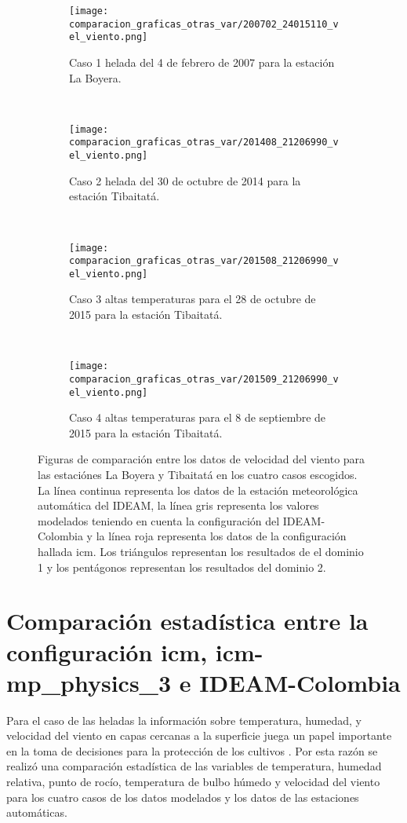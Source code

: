 \begin{figure}[H]
    
\begin{subfigure}[normla]{0.4\textwidth}
\caption{Caso 1 helada del 4 de febrero de 2007 para la estación La Boyera.}
\label{caso1_tiba_wrf_vv}
\texttt{[image: comparacion\_graficas\_otras\_var/200702\_24015110\_vel\_viento.png]}
\end{subfigure}
~
\begin{subfigure}[normla]{0.4\textwidth}
\caption{Caso 2 helada del 30 de octubre de 2014 para la estación Tibaitatá.}
\label{caso2_tiba_wrf_vv}
\texttt{[image: comparacion\_graficas\_otras\_var/201408\_21206990\_vel\_viento.png]}
\end{subfigure}
~
\centering
\begin{subfigure}[normla]{0.4\textwidth}
\caption{Caso 3 altas temperaturas para el 28 de octubre de 2015 para la estación Tibaitatá.}
\label{caso3_tiba_wrf_vv}
\texttt{[image: comparacion\_graficas\_otras\_var/201508\_21206990\_vel\_viento.png]}
\end{subfigure}
~
\centering
\begin{subfigure}[normla]{0.4\textwidth}
\caption{Caso 4 altas temperaturas para el 8 de septiembre de 2015 para la estación Tibaitatá.}
\label{caso4_tiba_wrf_vv}
\texttt{[image: comparacion\_graficas\_otras\_var/201509\_21206990\_vel\_viento.png]}
\end{subfigure}

    \caption{Figuras de comparación entre los datos de velocidad del viento para las estaciónes La Boyera y Tibaitatá en los cuatro casos escogidos. La línea continua representa los datos de la estación meteorológica automática del IDEAM, la línea gris representa los valores modelados teniendo en cuenta la configuración del IDEAM-Colombia y la línea roja representa los datos de la configuración hallada icm. Los triángulos representan los resultados de el dominio 1 y los pentágonos representan los resultados del dominio 2.}
    \label{fig:wrf_vv_tibaitata}
\end{figure}


\section{Comparación estadística entre la configuración icm, icm-mp\_physics\_3 e IDEAM-Colombia}

Para el caso de las heladas la información sobre temperatura, humedad, y velocidad del viento en capas cercanas a la superficie juega un papel importante en la toma de decisiones para la protección de los cultivos \citep{prabha2008}. Por esta razón se realizó una comparación estadística de las variables de temperatura, humedad relativa, punto de rocío, temperatura de bulbo húmedo y velocidad del viento para los cuatro casos de los datos modelados y los datos de las estaciones automáticas.\\

